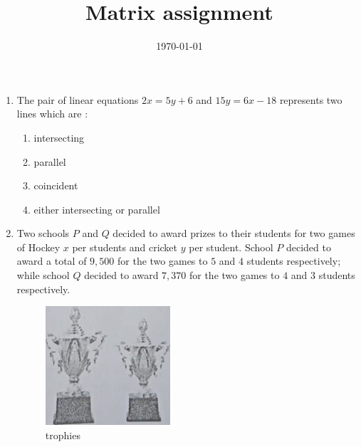 \documentclass[12pt,-letter paper]{article}
\title{Matrix assignment}
\date{\today}
\begin{document}
\begin{enumerate}
	\item The pair of linear equations $ 2x=5y+6 $ and $ 15y=6x-18 $ represents two lines which are : 
\begin{enumerate}
    \item intersecting
    \item parallel
    \item coincident
    \item either intersecting or parallel
\end{enumerate}
\item Two schools $P$ and $Q$ decided to award prizes to their students for two games of Hockey \rupee $x$ per students and cricket \rupee $y$ per student. School $P$
decided to award a total of \rupee $9,500$ for the two games to $5$ and $4$ students respectively; while school $Q$ decided to award \rupee $7,370$ for the two games to $4$ and $3$ students respectively.
\begin{figure}[H]
    \centering
    \includegraphics[width=\columnwidth]{figs/math.png}
    \caption{trophies}
    \label{fig:trophies}
\end{figure}



\end{enumerate}
\end{document}
